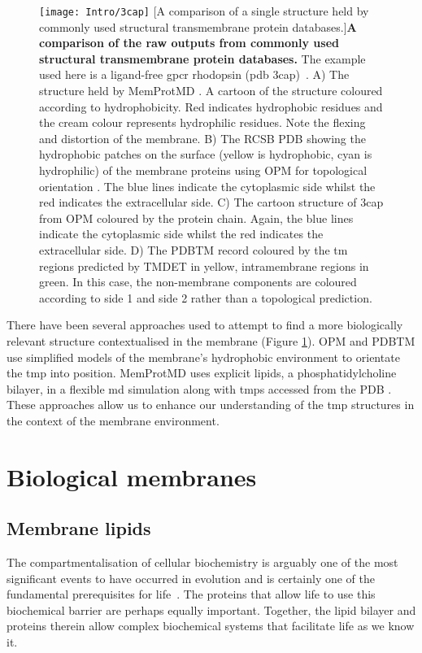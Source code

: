 \begin{figure}[ht!]
\centering
\texttt{[image: Intro/3cap]}
		[A comparison of a single structure held by commonly used structural transmembrane protein databases.]{\textbf{A comparison of the raw outputs from commonly used structural transmembrane protein databases.}
		The example used here is a ligand\--free \gls{gpcr} rhodopsin (\gls{pdb} 3cap)~\cite{Park2008}.
		A) The structure held by MemProtMD \cite{Stansfeld2015}. A cartoon of the structure coloured according to hydrophobicity. Red indicates hydrophobic residues and the cream colour represents hydrophilic residues. Note the flexing and distortion of the membrane.
		B) The RCSB PDB \cite{Berman2000} showing the hydrophobic patches on the surface (yellow is hydrophobic, cyan is hydrophilic) of the membrane proteins using OPM for topological orientation \cite{Lomize2012}.
		The blue lines indicate the cytoplasmic side whilst the red indicates the extracellular side.
		C) The cartoon structure of 3cap from OPM \cite{Lomize2012} coloured by the protein chain.
		Again, the blue lines indicate the cytoplasmic side whilst the red indicates the extracellular side.
		D) The PDBTM \cite{Kozma2012} record coloured by the \gls{tm} regions predicted by TMDET \cite{Tusnady2005} in yellow, intramembrane regions in green.
		In this case, the non\--membrane components are coloured according to side 1 and side 2 rather than a topological prediction.
		}

\label{fig:3cap}
\end{figure}

There have been several approaches used to attempt to find a more biologically relevant structure contextualised in the membrane (Figure \ref{fig:3cap}).
OPM \cite{Lomize2012} and PDBTM \cite{Kozma2012} use simplified models of the membrane's hydrophobic environment to orientate the \gls{tmp} into position.
MemProtMD \cite{Stansfeld2015} uses explicit lipids, a phosphatidylcholine bilayer, in a flexible \gls{md} simulation  along with \gls{tmp}s accessed from the PDB \cite{Berman2000}.
These approaches allow us to enhance our understanding of the \gls{tmp} structures in the context of the membrane environment.



\section{Biological membranes}
\subsection{Membrane lipids}
The compartmentalisation of cellular biochemistry is arguably one of the most significant events to have occurred in evolution and is certainly one of the fundamental prerequisites for life~\cite{Koshland2002}.
The proteins that allow life to use this biochemical barrier are perhaps equally important.
Together, the lipid bilayer and proteins therein allow complex biochemical systems that facilitate life as we know it.

